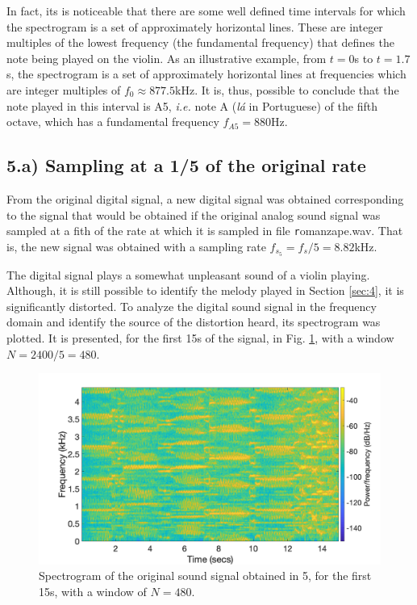 \documentclass[]{scrartcl}
\begin{document}
In fact, its is noticeable that there are some well defined time intervals for which the spectrogram is a set of approximately horizontal lines. These are integer multiples of the lowest frequency (the fundamental frequency) that defines the note being played on the violin. As an illustrative example, from $t=0$s to $t=1.7$s, the spectrogram is a set of approximately horizontal lines at frequencies which are integer multiples of $f_0 \approx 877.5$kHz. It is, thus, possible to conclude that the note played in this interval is A5, \textit{i.e.} note A (\textit{lá} in Portuguese) of the fifth octave, which has a fundamental frequency $f_{A5} = 880$Hz.

\subsection{5.a) Sampling at a 1/5 of the original rate}\label{sec:5}
From the original digital signal, a new digital signal was obtained corresponding to the signal that would be obtained if the original analog sound signal was sampled at a fith of the rate at which it is sampled in file {\texttt romanza\textunderscore pe.wav}. That is, the new signal was obtained with a sampling rate $f_{s_5} = f_s/5 = 8.82$kHz.

The digital signal plays a somewhat unpleasant sound of a violin playing. Although, it is still possible to identify the melody played in Section \ref{sec:4}, it is significantly distorted. To analyze the digital sound signal in the frequency domain and identify the source of the distortion heard, its spectrogram was plotted. It is presented, for the first 15s of the signal, in Fig. \ref{fig:spect_5}, with a window $N = 2400/5=480$.

\begin{figure}[htbp]
	\centering
	\includegraphics[width=1\textwidth]{figures/spect_5.png}
	\caption{Spectrogram of the original sound signal obtained in 5, for the first 15s, with a window of $N = 480$.}
	\label{fig:spect_5}
\end{figure}
\end{document}
